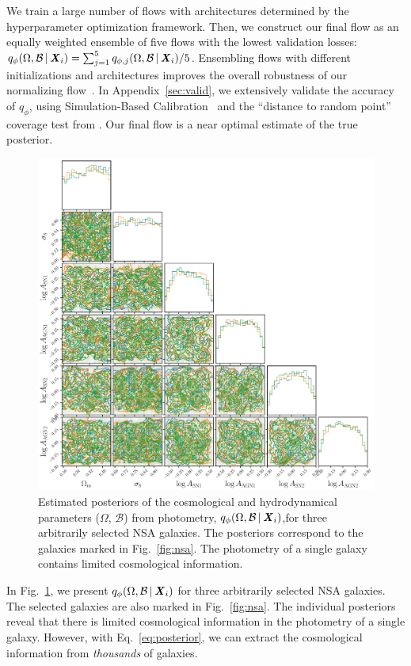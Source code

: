 We train a large number of flows with architectures determined by the
\cite{akiba2019} hyperparameter optimization framework.
Then, we construct our final flow as an equally weighted ensemble of five
flows with the lowest validation losses: 
$q_{\phi}(\Omega, \mathcal{B}\,|\, {\textbf{\textit{X}}_i}) = 
\sum_{j=1}^5 q_{\phi,j}(\Omega, \mathcal{B}\,|\, {\textbf{\textit{X}}_i})/5$. 
Ensembling flows with different initializations and architectures improves the
overall robustness of our normalizing flow~\citep{alsing2019}.
In Appendix~\ref{sec:valid}, we extensively validate the accuracy of $q_\phi$,
using Simulation-Based Calibration~\citep{talts2020} and the ``distance to
random point'' coverage test from \cite{lemos2023}. 
Our final flow is a near optimal estimate of the true posterior. 

\begin{figure}[ht]
\vskip 0.2in
\begin{center}
    \centerline{\includegraphics[width=\columnwidth]{figs/p_omega_x_i.pdf}}
    \caption{Estimated posteriors of the cosmological and hydrodynamical 
    parameters ($\Omega$, $\mathcal{B}$) from photometry, 
    $q_{\phi}(\Omega, \mathcal{B}\,|\, {\textbf{\textit{X}}_i})$,for three arbitrarily 
    selected NSA galaxies. 
    The posteriors correspond to the galaxies marked in Fig.~\ref{fig:nsa}.
    The photometry of a single galaxy contains limited cosmological
    information. 
    }\label{fig:p_omega_x_i}
\end{center}
\vskip -0.2in
\end{figure}

In Fig.~\ref{fig:p_omega_x_i}, we present 
$q_{\phi}(\Omega, \mathcal{B}\,|\, {\textbf{\textit{X}}_i})$
for three arbitrarily selected NSA galaxies. 
The selected galaxies are also marked in Fig.~\ref{fig:nsa}. 
The individual posteriors reveal that  there is limited cosmological
information in the photometry of a single galaxy. 
However, with Eq.~\ref{eq:posterior}, we can extract the cosmological
information from {\em thousands} of galaxies.
